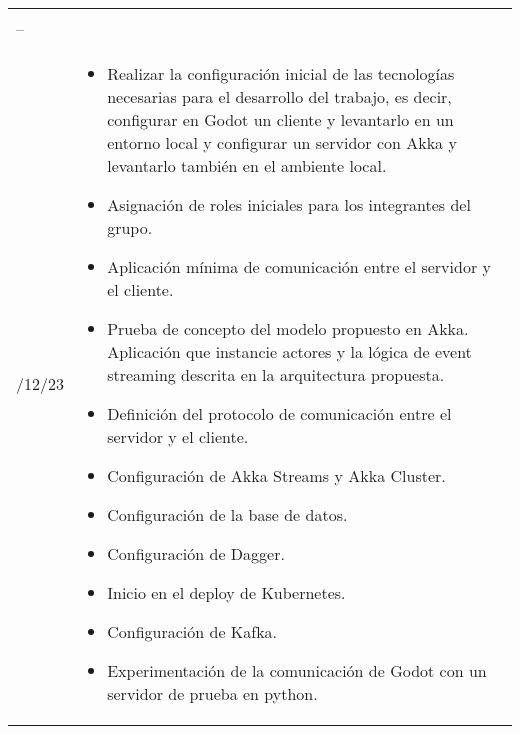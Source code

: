 \begin{longtable}{|>{\centering\arraybackslash}p{3cm}|>{\centering\arraybackslash}p{\dimexpr\textwidth-4cm\relax}|}
    \multirow{3}{3cm}{\centering 10/11/23 \\ -- \\ 6/12/23} &
    \begin{itemize}[left=0pt]
        \item Realizar la configuración inicial de las tecnologías necesarias para el desarrollo del trabajo, es decir, configurar en Godot un cliente y levantarlo en un entorno local y configurar un servidor con Akka y levantarlo también en el ambiente local.
        \item Asignación de roles iniciales para los integrantes del grupo.
        \item Aplicación mínima de comunicación entre el servidor y el cliente.
        \item Prueba de concepto del modelo propuesto en Akka. Aplicación que instancie actores y la lógica de event streaming descrita en la arquitectura propuesta.
        \item Definición del protocolo de comunicación entre el servidor y el cliente.
        \item Configuración de Akka Streams y Akka Cluster.
        \item Configuración de la base de datos.
        \item Configuración de Dagger.
        \item Inicio en el deploy de Kubernetes.
        \item Configuración de Kafka.
        \item Experimentación de la comunicación de Godot con un servidor de prueba en python.

    \end{itemize} \\ \hline


\end{longtable}
